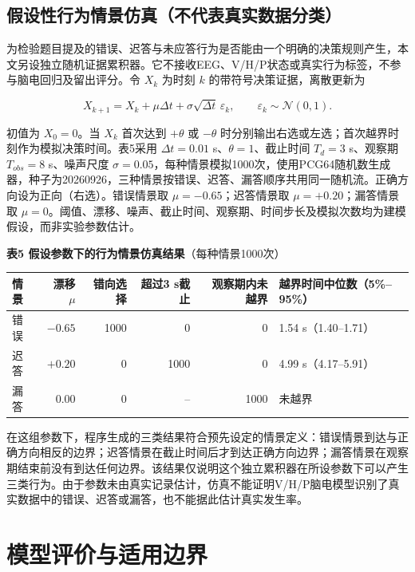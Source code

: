 \documentclass[UTF8,12pt,a4paper,fontset=windows]{ctexart}
\begin{document}
\hypertarget{ux6a21ux578bux8bc4ux4ef7ux4e0eux9002ux7528ux8fb9ux754c}{%
\subsection{假设性行为情景仿真（不代表真实数据分类）}

为检验题目提及的错误、迟答与未应答行为是否能由一个明确的决策规则产生，本文另设独立随机证据累积器。它不接收EEG、V/H/P状态或真实行为标签，不参与脑电回归及留出评分。令 \(X_k\) 为时刻 \(k\) 的带符号决策证据，离散更新为

\[
X_{k+1}=X_k+\mu\Delta t+\sigma\sqrt{\Delta t}\,\varepsilon_k,
\qquad \varepsilon_k\sim\mathcal N(0,1).
\]

初值为 \(X_0=0\)。当 \(X_k\) 首次达到 \(+\theta\) 或 \(-\theta\) 时分别输出右选或左选；首次越界时刻作为模拟决策时间。表5采用 \(\Delta t=0.01\) s、\(\theta=1\)、截止时间 \(T_d=3\) s、观察期 \(T_{obs}=8\) s、噪声尺度 \(\sigma=0.05\)，每种情景模拟1000次，使用PCG64随机数生成器，种子为20260926，三种情景按错误、迟答、漏答顺序共用同一随机流。正确方向设为正向（右选）。错误情景取 \(\mu=-0.65\)；迟答情景取 \(\mu=+0.20\)；漏答情景取 \(\mu=0\)。阈值、漂移、噪声、截止时间、观察期、时间步长及模拟次数均为建模假设，而非实验参数估计。

\textbf{表5 假设参数下的行为情景仿真结果}（每种情景1000次）

\begin{center}
\small
\begin{tabular}{@{}lrrrrl@{}}
\toprule
情景 & 漂移 \(\mu\) & 错向选择 & 超过3 s截止 & 观察期内未越界 & 越界时间中位数（5\%--95\%） \\
\midrule
错误 & $-0.65$ & 1000 & 0 & 0 & 1.54 s（1.40--1.71） \\
迟答 & $+0.20$ & 0 & 1000 & 0 & 4.99 s（4.17--5.91） \\
漏答 & $0.00$ & 0 & -- & 1000 & 未越界 \\
\bottomrule
\end{tabular}
\end{center}

在这组参数下，程序生成的三类结果符合预先设定的情景定义：错误情景到达与正确方向相反的边界；迟答情景在截止时间后才到达正确方向边界；漏答情景在观察期结束前没有到达任何边界。该结果仅说明这个独立累积器在所设参数下可以产生三类行为。由于参数未由真实记录估计，仿真不能证明V/H/P脑电模型识别了真实数据中的错误、迟答或漏答，也不能据此估计真实发生率。

\section{模型评价与适用边界}\label{ux6a21ux578bux8bc4ux4ef7ux4e0eux9002ux7528ux8fb9ux754c}}
\end{document}
